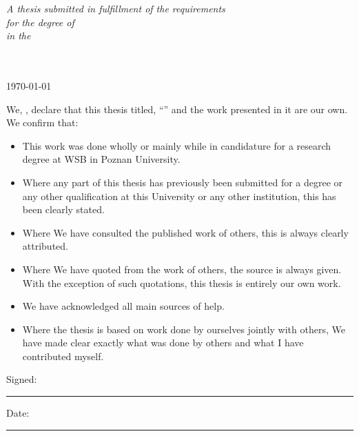 \documentclass[
    11pt,
    english, %
    singlespacing, %
    headsepline, %
    oneside, %
]{MastersDoctoralThesis} %
\begin{document}
\begin{titlepage}
\begin{center}
            \vfill

            \large \textit{A thesis submitted in fulfillment of the requirements\\ for the degree of \degreename}\\[0.3cm] %
            \textit{in the}\\[0.4cm]
            \groupname\\\deptname\\[2cm] %

            \vfill

            {\large \today}\\[4cm] %

            \vfill
        \end{center}
    \end{titlepage}


    \begin{declaration}
        \addchaptertocentry{\authorshipname} %
        \noindent We, \authorname, declare that this thesis titled, \enquote{\ttitle} and the work presented in it are our own.
        We confirm that:

        \begin{itemize}
            \item This work was done wholly or mainly while in candidature for a research degree at WSB in Poznan University.
            \item Where any part of this thesis has previously been submitted for a degree or any other qualification
            at this University or any other institution, this has been clearly stated.
            \item Where We have consulted the published work of others, this is always clearly attributed.
            \item Where We have quoted from the work of others, the source is always given.
            With the exception of such quotations, this thesis is entirely our own work.
            \item We have acknowledged all main sources of help.
            \item Where the thesis is based on work done by ourselves jointly with others,
            We have made clear exactly what was done by others and what I have contributed myself.\\
        \end{itemize}

        \noindent Signed: \\
        \rule[0.5em]{25em}{0.5pt} %

        \noindent Date: \\
        \rule[0.5em]{25em}{0.5pt} %
    \end{declaration}
\end{document}
